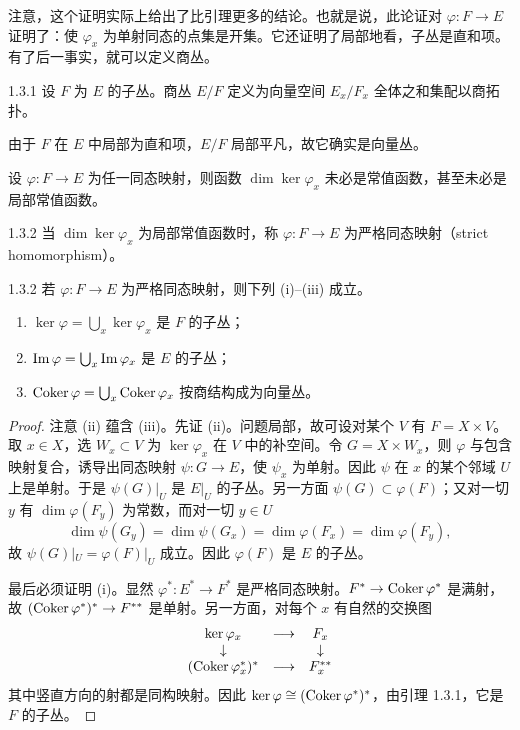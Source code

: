 注意，这个证明实际上给出了比引理更多的结论。也就是说，此论证对 $\varphi\colon F\to E$ 证明了：使 $\varphi_x$ 为单射同态的点集是开集。它还证明了局部地看，子丛是直和项。有了后一事实，就可以定义商丛。

\begin{definition}{1.3.1}
  设 $F$ 为 $E$ 的子丛。商丛 $E/F$ 定义为向量空间 $E_x/F_x$ 全体之和集配以商拓扑。
\end{definition}


由于 $F$ 在 $E$ 中局部为直和项，$E/F$ 局部平凡，故它确实是向量丛。

设 $\varphi\colon F\to E$ 为任一同态映射，则函数 $\dim\ker\varphi_x$ 未必是常值函数，甚至未必是局部常值函数。

\begin{definition}{1.3.2}
  当 $\dim\ker\varphi_x$ 为局部常值函数时，称 $\varphi\colon F\to E$ 为严格同态映射（strict homomorphism）。
\end{definition}

\begin{proposition*}{1.3.2}
  若 $\varphi\colon F\to E$ 为严格同态映射，则下列 (i)–(iii) 成立。
  \begin{enumerate}[label=(\roman*),leftmargin=2.4em,itemsep=1pt]
  \item $\ker\varphi=\bigcup_x\ker\varphi_x$ 是 $F$ 的子丛；
  \item $\operatorname{Im}\varphi=\bigcup_x\operatorname{Im}\varphi_x$ 是 $E$ 的子丛；
  \item $\operatorname{Coker}\varphi=\bigcup_x\operatorname{Coker}\varphi_x$ 按商结构成为向量丛。
  \end{enumerate}
\end{proposition*}

\begin{proof}
  注意 (ii) 蕴含 (iii)。先证 (ii)。问题局部，故可设对某个 $V$ 有 $F=X\times V$。取 $x\in X$，选 $W_x\subset V$ 为 $\ker\varphi_x$ 在 $V$ 中的补空间。令 $G=X\times W_x$，则 $\varphi$ 与包含映射复合，诱导出同态映射 $\psi\colon G\to E$，使 $\psi_x$ 为单射。因此 $\psi$ 在 $x$ 的某个邻域 $U$ 上是单射。于是 $\psi(G)|_U$ 是 $E|_U$ 的子丛。另一方面 $\psi(G)\subset\varphi(F)$；又对一切 $y$ 有 $\dim\varphi(F_y)$ 为常数，而对一切 $y\in U$
\[
\dim\psi(G_y)=\dim\psi(G_x)=\dim\varphi(F_x)=\dim\varphi(F_y),
\]
故 $\psi(G)|_U=\varphi(F)|_U$ 成立。因此 $\varphi(F)$ 是 $E$ 的子丛。

最后必须证明 (i)。显然 $\varphi^*\colon E^*\to F^*$ 是严格同态映射。$F^*\to\operatorname{Coker}\varphi^*$ 是满射，故 $(\operatorname{Coker}\varphi^*)^*\to F^{**}$ 是单射。另一方面，对每个 $x$ 有自然的交换图
\[
\begin{array}{ccc}
\ker\varphi_x & \longrightarrow & F_x\\
\downarrow & & \downarrow\\
(\operatorname{Coker}\varphi_x^*)^* & \longrightarrow & F_x^{**}
\end{array}
\]
其中竖直方向的射都是同构映射。因此 $\ker\varphi\cong(\operatorname{Coker}\varphi^*)^*$，由引理 1.3.1，它是 $F$ 的子丛。
\end{proof}

